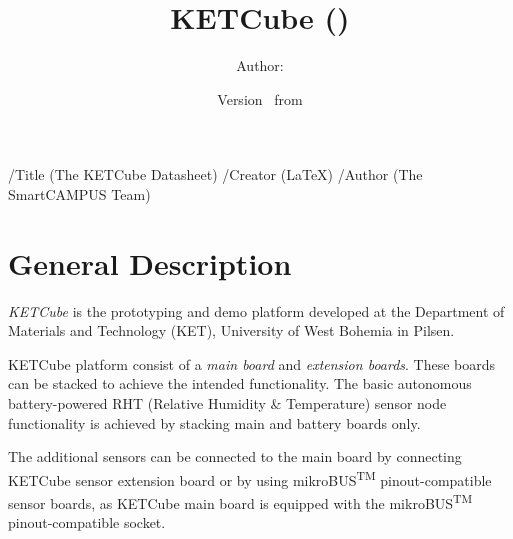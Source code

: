 

\pdfinfo
{
  /Title       (The KETCube Datasheet)
  /Creator     (LaTeX)
  /Author      (The SmartCAMPUS Team)
}

\title{\UWBLogo KETCube (\vhCurrentVersion)}

\author{Author: \vhListAllAuthorsLongWithAbbrev}
\date{Version \vhCurrentVersion\ from \vhCurrentDate}



\titlepage
\maketitle

\section*{General Description}
%
{\it KETCube} is the prototyping and demo platform developed at the Department of Materials and Technology (KET), University of West Bohemia in Pilsen. 

KETCube platform consist of a {\it main board} and {\it extension boards}.
These boards can be stacked to achieve the intended functionality. The basic autonomous battery-powered RHT (Relative Humidity \& Temperature) sensor node functionality is achieved by stacking main and battery boards only. 

The additional sensors can be connected to the main board by connecting KETCube sensor extension board or by using mikroBUS\textsuperscript{TM} pinout-compatible sensor boards, as KETCube main board is equipped with the mikroBUS\textsuperscript{TM} pinout-compatible socket.



